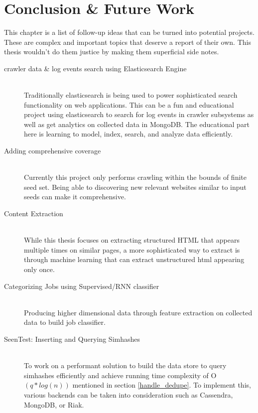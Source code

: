 \chapter{Conclusion \& Future Work}
This chapter is a list of follow-up ideas that can be turned into potential projects. These are complex and
important topics that deserve a report of their own. This thesis wouldn't do them justice by making
them superficial side notes.

\begin{description}
  \item[crawler data \& log events search using Elasticsearch Engine] \hfill \\
    Traditionally elasticsearch is being used to power sophisticated search functionality on web
    applications. This can be a fun and educational project using elasticsearch to search for log
    events in crawler subsystems as well as get analytics on collected data in MongoDB. The educational
    part here is learning to model, index, search, and analyze data efficiently.
  \item[Adding comprehensive coverage] \hfill \\
    Currently this project only performs crawling within the bounds of finite seed set. Being able to
    discovering new relevant websites similar to input seeds can make it comprehensive.
  \item[Content Extraction] \hfill \\
    While this thesis focuses on extracting structured HTML that appears multiple times on similar pages,
    a more sophisticated way to extract is through machine learning that can extract unstructured html
    \cite{contentExtract} appearing only once.
  \item[Categorizing Jobs using Supervised/RNN classifier] \hfill \\
    Producing higher dimensional data through feature extraction on collected data to build job
    classifier.
  \item[SeenTest: Inserting and Querying Simhashes] \hfill \\
    To work on a performant solution to build the data store to query simhashes efficiently and achieve
    running time complexity of O$(q * log(n))$ mentioned in section \ref{handle_dedupe}. To implement
    this, various backends can be taken into consideration such as Cassendra, MongoDB, or Riak.
    
\end{description}

\pagebreak